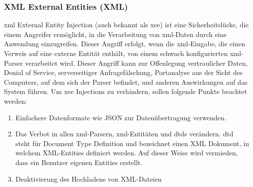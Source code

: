\subsubsection{XML External Entities (XML)}

\acs{xml} External Entity Injection (auch bekannt als \acs{xee}) ist eine
Sicherheitslücke, die einem Angreifer ermöglicht, in die Verarbeitung
von \acs{xml}-Daten durch eine Anwendung einzugreifen. Dieser Angriff
erfolgt, wenn die \acs{xml}-Eingabe, die einen Verweis auf eine externe
Entität enthält, von einem schwach konfigurierten \acs{xml}-Parser
verarbeitet wird. Dieser Angriff kann zur Offenlegung vertraulicher
Daten, Denial of Service, serverseitiger Anfragefälschung,
Portanalyse aus der Sicht des Computers, auf dem sich der Parser
befindet, und anderen Auswirkungen auf das System führen. Um \acs{xee}
Injections zu verhindern, sollen folgende Punkte beachtet werden:


\begin{enumerate}
    \item Einfachere Datenformate wie JSON zur Datenübertragung verwenden.
    \item Das Verbot in allen \acs{xml}-Parsern, \acs{xml}-Entitäten
     und \acs{dtd}s verändern. \acs{dtd} steht für Document Type Definition und
     bezeichnet einen XML Dokument, in welchem XML-Entities
     definiert werden. Auf dieser Weise wird vermieden,
     dass ein Benutzer eigenen Entities erstellt.
    \item Deaktivierung des Hochladens von XML-Dateien
\end{enumerate}
